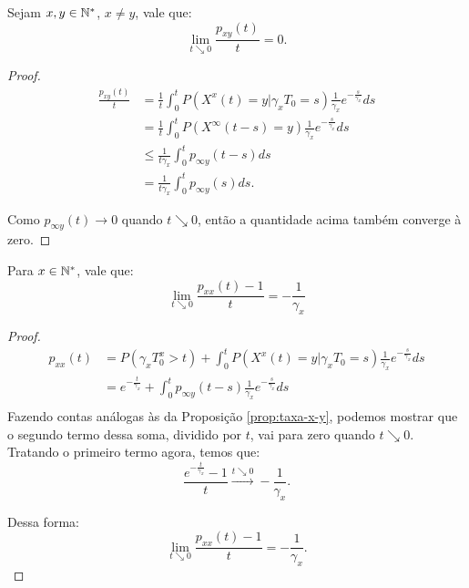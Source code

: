 \begin{proposicao}
  \label{prop:taxa-x-y}
  Sejam $x, y \in {\mathbb{N^*}}$, $x \neq y$, vale que:
  \begin{displaymath}
    \lim_{t \searrow 0} \frac{p_{xy}(t)}{t} = 0.
  \end{displaymath}
\end{proposicao}
\begin{proof}
  \begin{align*}
    \frac{p_{x y} (t)}{t}
    &= \frac{1}{t}\int_{0}^{t} P( X^x(t) = y |
    \gamma_x T_0 = s) \frac{1}{\gamma_x} e^{-\frac{s}{\gamma_x}} ds\\
    &= \frac{1}{t} \int_{0}^{t} P( X^\infty(t-s) = y ) \frac{1}{\gamma_x}
    e^{-\frac{s}{\gamma_x}} ds \\
    &\leq \frac{1}{t \gamma_x} \int_{0}^{t} p_{\infty y}(t-s) ds \\
    &= \frac{1}{t \gamma_x} \int_{0}^{t} p_{\infty y}(s) ds.
  \end{align*}

  Como $p_{\infty y} (t) \to 0$ quando $t \searrow 0$, então a
  quantidade acima também converge à zero.
\end{proof}

\begin{proposicao}
  \label{prop:taxa-x-x}
  Para $x \in {\mathbb{N^*}}$, vale que:
  \begin{displaymath}
    \lim_{t \searrow 0} \frac{p_{xx}(t) - 1}{t} = -\frac{1}{\gamma_x}
  \end{displaymath}
\end{proposicao}
\begin{proof}
  \begin{align*}
    p_{xx} (t)
    &= P( \gamma_x T_0^x > t) + 
    \int_{0}^{t} P( X^x(t) = y |
    \gamma_x T_0 = s) \frac{1}{\gamma_x} e^{-\frac{s}{\gamma_x}} ds\\
    &= e^{-\frac{t}{\gamma_x}} + 
    \int_{0}^{t} p_{\infty y}(t-s) \frac{1}{\gamma_x} e^{-\frac{s}{\gamma_x}} ds\\
  \end{align*}
  Fazendo contas análogas às da Proposição \ref{prop:taxa-x-y},
  podemos mostrar que o segundo termo dessa soma, dividido por $t$,
  vai para zero quando $t \searrow 0$. Tratando o primeiro termo
  agora, temos que:
  \begin{displaymath}
    \frac{e^{-\frac{t}{\gamma_x}} - 1}{t} \xrightarrow{t \searrow 0}
    -\frac{1}{\gamma_x}.
  \end{displaymath}

  Dessa forma:
  \begin{displaymath}
     \lim_{t \searrow 0} \frac{p_{xx} (t) - 1}{t} = -\frac{1}{\gamma_x}.
  \end{displaymath}
  
\end{proof}


